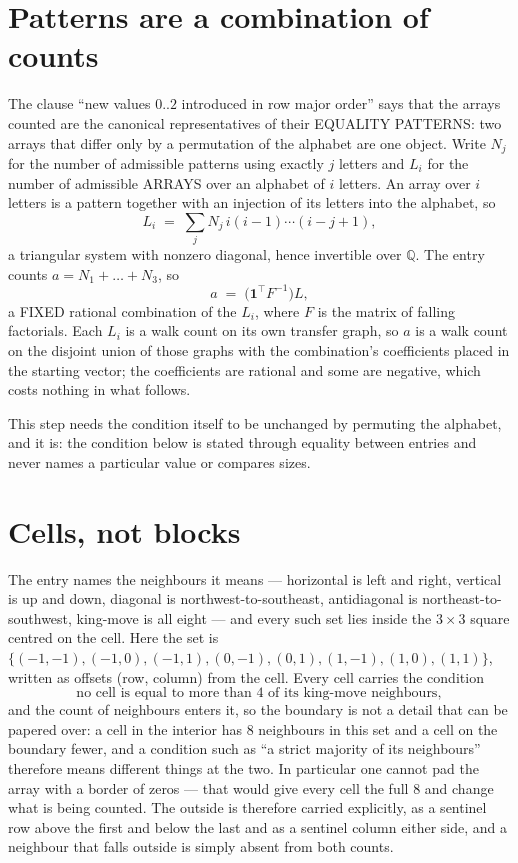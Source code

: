 \documentclass[11pt,a4paper]{article}
\theoremstyle{plain}
\theoremstyle{definition}
\begin{document}
\section{Patterns are a combination of counts}

The clause ``new values $0..2$ introduced in row major order'' says that the arrays
counted are the canonical representatives of their EQUALITY PATTERNS: two arrays that differ
only by a permutation of the alphabet are one object. Write $N_j$ for the number of admissible
patterns using exactly $j$ letters and $L_i$ for the number of admissible ARRAYS over an
alphabet of $i$ letters. An array over $i$ letters is a pattern together with an injection of
its letters into the alphabet, so
\[
L_i\;=\;\sum_{j}N_j\,i(i-1)\cdots(i-j+1),
\]
a triangular system with nonzero diagonal, hence invertible over $\mathbb{Q}$. The entry
counts $a=N_1+\dots+N_{3}$, so
\[
a\;=\;\bigl(\mathbf{1}^{\!\top}F^{-1}\bigr)L ,
\]
a FIXED rational combination of the $L_i$, where $F$ is the matrix of falling factorials.
Each $L_i$ is a walk count on its own transfer graph, so $a$ is a walk count on the disjoint
union of those graphs with the combination's coefficients placed in the starting vector; the
coefficients are rational and some are negative, which costs nothing in what follows.

This step needs the condition itself to be unchanged by permuting the alphabet, and it is:
the condition below is stated through equality between entries and never names a particular
value or compares sizes.

\section{Cells, not blocks}

The entry names the neighbours it means --- horizontal is left and right, vertical is up and
down, diagonal is northwest-to-southeast, antidiagonal is northeast-to-southwest, king-move is
all eight --- and every such set lies inside the $3\times3$ square centred on the cell. Here
the set is $\{(-1,-1), (-1,0), (-1,1), (0,-1), (0,1), (1,-1), (1,0), (1,1)\}$, written as offsets (row, column) from the cell. Every cell carries
the condition
\[
\text{no cell is equal to more than 4 of its king-move neighbours},
\]
and the count of neighbours enters it, so the boundary is not a detail that can be papered
over: a cell in the interior has $8$ neighbours in this set and a cell on the boundary
fewer, and a condition such as ``a strict majority of its neighbours'' therefore means
different things at the two. In particular one cannot pad the array with a border of zeros ---
that would give every cell the full $8$ and change what is being counted. The outside is
therefore carried
explicitly, as a sentinel row above the first and below the last and as a sentinel column
either side, and a neighbour that falls outside is simply absent from both counts.
\end{document}
